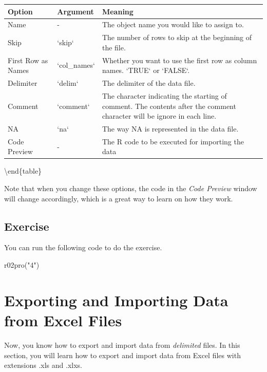 \documentclass[
]{book}
\newenvironment{Shaded}{\begin{snugshade}}{\end{snugshade}}
\newcommand{\FunctionTok}[1]{\textcolor[rgb]{0.00,0.00,0.00}{#1}}
\newcommand{\NormalTok}[1]{#1}
\newcommand{\StringTok}[1]{\textcolor[rgb]{0.31,0.60,0.02}{#1}}
\begin{document}
\begin{tabular}[t]{l|l|l}
\hline
Option & Argument & Meaning\\
\hline
Name & - & The object name you would like to assign to.\\
\hline
Skip & `skip` & The number of rows to skip at the beginning of the file.\\
\hline
First Row as Names & `col\_names` & Whether you want to use the first row as column names. `TRUE` or `FALSE`.\\
\hline
Delimiter & `delim` & The delimiter of the data file.\\
\hline
Comment & `comment` & The character indicating the starting of comment. The contents after the comment character will be ignore in each line.\\
\hline
NA & `na` & The way NA is represented in the data file.\\
\hline
Code Preview & - & The R code to be executed for importing the data\\
\hline
\end{tabular}

\textbackslash end\{table\}

Note that when you change these options, the code in the \emph{Code Preview} window will change accordingly, which is a great way to learn on how they work.

\hypertarget{exercise-7}{%
\subsection{Exercise}\label{exercise-7}}

You can run the following code to do the exercise.

\begin{Shaded}
\begin{Highlighting}[]
\FunctionTok{r02pro}\NormalTok{(}\StringTok{"4"}\NormalTok{)}
\end{Highlighting}
\end{Shaded}

\hypertarget{import-excel}{%
\section{Exporting and Importing Data from Excel Files}\label{import-excel}}

Now, you know how to export and import data from \emph{delimited} files. In this section, you will learn how to export and import data from Excel files with extensions .xls and .xlxs.
\end{document}
